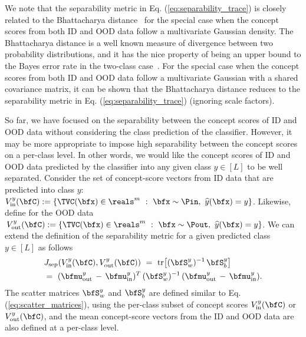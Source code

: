 
We note that the separability metric in Eq. (\ref{eq:separability_trace}) is closely related to the Bhattacharya distance~\cite{bhattacharyya1943measure} for the special case when the concept scores from both ID and OOD data follow a multivariate Gaussian density. The Bhattacharya distance is a well known measure of divergence between two probability distributions, and it has the nice property of being an upper bound to the Bayes error rate in the two-class case~\cite{fukunaga1990bhatta}. For the special case when the concept scores from both ID and OOD data follow a multivariate Gaussian with a shared covariance matrix, it can be shown that the Bhattacharya distance reduces to the separability metric in Eq. (\ref{eq:separability_trace}) (ignoring scale factors). 

So far, we have focused on the separability between the concept scores of ID and OOD data without considering the class prediction of the classifier.
However, it may be more appropriate to impose high separability between the concept scores on a per-class level. In other words, we would like the concept scores of ID and OOD data predicted by the classifier into any given class $y \in [L]$ to be well separated.
Consider the set of concept-score vectors from ID data that are predicted into class $y$: $V^{y}_{\textrm{in}}(\bfC) := \{\TVC(\bfx) \in \reals^m ~:~ \bfx \sim \Pin, ~\widehat{y}(\bfx) = y\}$. 
Likewise, define for the OOD data $\,V^{y}_{\textrm{out}}(\bfC) := \{\TVC(\bfx) \in \reals^m ~:~ \bfx \sim \Pout, ~\widehat{y}(\bfx) = y\}$. 
We can extend the definition of the separability metric for a given predicted class $y \in [L]$ as follows
\begin{align}
\label{eq:separability_trace_per_class}
&J_{\textrm{sep}}(V^{y}_{\textrm{in}}(\bfC), V^{y}_{\textrm{out}}(\bfC)) ~=~ \textrm{tr}\big[(\bfS^{y}_w)^{-1} \,\bfS^y_b\big] \nonumber \\
&=~ (\bfmu^y_{\textrm{out}} \,-\, \bfmu^y_{\textrm{in}})^T \,(\bfS^y_w)^{-1} \,(\bfmu^y_{\textrm{out}} \,-\, \bfmu^y_{\textrm{in}}).
\end{align}
The scatter matrices $\bfS^y_w$ and $\bfS^y_b$ are defined similar to Eq. (\ref{eq:scatter_matrices}), using the per-class subset of concept scores $V^{y}_{\textrm{in}}(\bfC)$ or $V^{y}_{\textrm{out}}(\bfC)$, and the mean concept-score vectors from the ID and OOD data are also defined at a per-class level.

